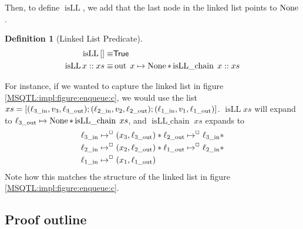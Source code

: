 \documentclass[twoside,11pt,openright]{report}
\newtheorem{definition}{Definition}[section]
\newcommand{\isLLchain}[1]{\operatorname{isLL\_chain} \; #1}
\newcommand{\isLL}{\operatorname{isLL}}
\newcommand{\locin}[1]{\loc_{#1\_\text{in}}}
\newcommand{\locout}[1]{\loc_{#1\_\text{out}}}
\newcommand{\nOut}[1]{\operatorname{out} \; #1}
\begin{document}
Then, to define $\isLL$, we add that the last node in the linked list points to $\operatorname{None}$.
\begin{definition}[Linked List Predicate]
  \begin{align*}
    \isLL{[]} \equiv& \TRUE\\
    \isLL{x :: xs} \equiv& \nOut{x} \mapsto \None \ast \isLLchain{x :: xs}
  \end{align*}
\end{definition}

For instance, if we wanted to capture the linked list in figure \ref{MSQTL:impl:figure:enqueue:c}, we would use the list $xs = [(\locin{3}, v_3, \locout{3}); (\locin{2}, v_2, \locout{2});  (\locin{1}, v_1, \locout{1})]$. $\isLL{xs}$ will expand to $\locout{3} \mapsto \None \ast \isLLchain{xs}$, and $\isLLchain{xs}$ expands to
\begin{align*}
  &\locin{3} \mapsto^{\persistently} (x_3, \locout{3}) \ast \locout{2}	\mapsto^{\persistently} \locin{3}\ast\\
  &\locin{2} \mapsto^{\persistently} (x_2, \locout{2}) \ast \locout{1}\mapsto^{\persistently} \locin{2} \ast\\
  &\locin{1} \mapsto^{\persistently} (x_1, \locout{1})
\end{align*}
Note how this matches the structure of the linked list in figure \ref{MSQTL:impl:figure:enqueue:c}.

\subsection{Proof outline}
\end{document}
